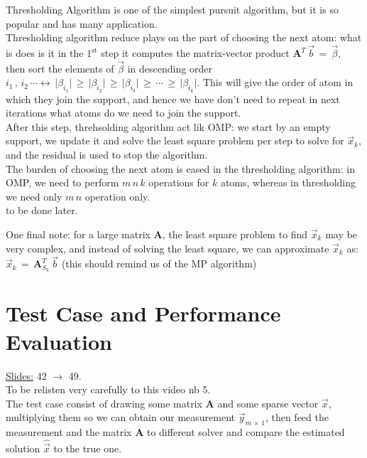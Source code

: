 \documentclass[12pt,a4paper]{book}
\begin{document}
Thresholding Algorithm is one of the simplest pursuit algorithm, but it is so popular and has many application.\\

Thresholding algorithm reduce plays on the part of choosing the next atom: what is does is it in the $\mathrm{1}^\mathrm{st}$ step it computes the matrix-vector product $\boldsymbol A^T \, \Vec{b} \, = \, \Vec{\beta}$, then sort the elements of $\Vec{\beta}$ in descending order $i_1 \, , \, i_2 \, \cdots \leftrightarrow \, \lvert \beta_{i_1} \rvert \, \geq \, \lvert \beta_{i_2} \rvert \, \geq \, \lvert \beta_{i_3} \rvert \, \geq \,  \cdots \, \geq \, \lvert \beta_{i_k} \rvert$. This will give the order of atom in which they join the support, and hence we have don't need to repeat in next iterations what atoms do we need to join the support.\\

After this step, threhsolding algorithm act lik OMP: we start by an empty support, we update it and solve the least square problem per step to solve for $\Vec{x}_k$, and the residual is used to stop the algorithm.\\

The burden of choosing the next atom is eased in the thresholding algorithm: in OMP, we need to perform $m \, n \, k$ operations for $k$ atoms, whereas in thresholding we need only $m \, n$ operation only.\\


 to be done later.

One final note: for a large matrix $\boldsymbol A$, the least square problem to find $\Vec{x}_k$ may be very complex, and instead of solving the least square, we can approximate $\Vec{x}_k$ as: $\Vec{x}_k \, = \, \boldsymbol A_{S_k}^T \, \Vec{b}$ (this should remind us of the MP algorithm)


\newpage
\section{Test Case and Performance Evaluation}

\underline{Slides:} 42 $\rightarrow$ 49.\\

 To be relisten very carefully to this video nb 5.\\

The test case consist of drawing some matrix $\boldsymbol A$ and some sparse vector $\vec{x}$, multiplying them so we can obtain our measurement $\vec{y}_{m \,  \times \, 1}$, then feed the measurement and the matrix $\boldsymbol A$ to different solver and compare the estimated solution $\hat{\vec{x}}$ to the true one.\\
\end{document}
